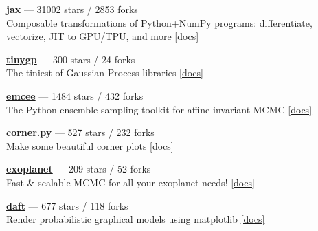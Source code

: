 \item \href{https://github.com/jax-ml/jax}{{\bf jax}} --- 31002 stars / 2853 forks \\
Composable transformations of Python+NumPy programs: differentiate, vectorize, JIT to GPU/TPU, and more \href{http://jax.readthedocs.io/}{[docs]}

\item \href{https://github.com/dfm/tinygp}{{\bf tinygp}} --- 300 stars / 24 forks \\
The tiniest of Gaussian Process libraries \href{https://tinygp.readthedocs.io}{[docs]}

\item \href{https://github.com/dfm/emcee}{{\bf emcee}} --- 1484 stars / 432 forks \\
The Python ensemble sampling toolkit for affine-invariant MCMC \href{https://emcee.readthedocs.io}{[docs]}

\item \href{https://github.com/dfm/corner.py}{{\bf corner.py}} --- 527 stars / 232 forks \\
Make some beautiful corner plots \href{http://corner.readthedocs.io}{[docs]}

\item \href{https://github.com/exoplanet-dev/exoplanet}{{\bf exoplanet}} --- 209 stars / 52 forks \\
Fast {\&} scalable MCMC for all your exoplanet needs!  \href{https://docs.exoplanet.codes}{[docs]}

\item \href{https://github.com/daft-dev/daft}{{\bf daft}} --- 677 stars / 118 forks \\
Render probabilistic graphical models using matplotlib \href{https://docs.daft-pgm.org}{[docs]}